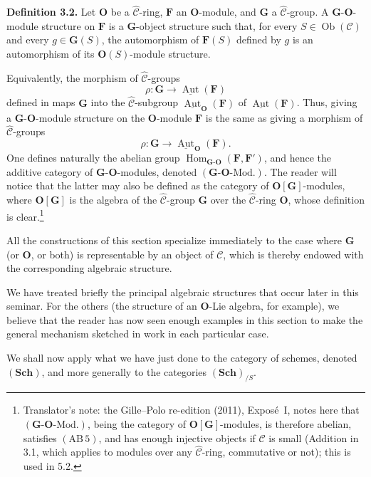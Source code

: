 \medskip
\noindent{}\textbf{Definition 3.2.}
Let \(\mathbf O\) be a \(\widehat{\mathscr C}\)-ring,
\(\mathbf F\) an \(\mathbf O\)-module, and \(\mathbf G\) a
\(\widehat{\mathscr C}\)-group. A \(\mathbf G\)-\(\mathbf O\)-module
structure on \(\mathbf F\) is a \(\mathbf G\)-object structure such that,
for every \(S\in\operatorname{Ob}(\mathscr C)\) and every
\(g\in\mathbf G(S)\), the automorphism of \(\mathbf F(S)\) defined by
\(g\) is an automorphism of its \(\mathbf O(S)\)-module structure.

Equivalently, the morphism of \(\widehat{\mathscr C}\)-groups
\[
  \rho:\mathbf G\longrightarrow
    \underline{\operatorname{Aut}}(\mathbf F)
\]
defined in  maps \(\mathbf G\) into the
\(\widehat{\mathscr C}\)-subgroup
\(\underline{\operatorname{Aut}}_{\mathbf O}(\mathbf F)\) of
\(\underline{\operatorname{Aut}}(\mathbf F)\). Thus, giving a
\(\mathbf G\)-\(\mathbf O\)-module structure on the
\(\mathbf O\)-module \(\mathbf F\) is the same as giving a morphism of
\(\widehat{\mathscr C}\)-groups
\[
  \rho:\mathbf G\longrightarrow
    \underline{\operatorname{Aut}}_{\mathbf O}(\mathbf F).
\]
One defines naturally the abelian group
\(\operatorname{Hom}_{\mathbf G\text{-}\mathbf O}
  (\mathbf F,\mathbf F')\), and hence the additive category of
\(\mathbf G\)-\(\mathbf O\)-modules, denoted
\((\mathbf G\text{-}\mathbf O\text{-Mod.})\). The reader will notice that the latter
may also be defined as the category of \(\mathbf O[\mathbf G]\)-modules,
where \(\mathbf O[\mathbf G]\) is the algebra of the
\(\widehat{\mathscr C}\)-group \(\mathbf G\) over the
\(\widehat{\mathscr C}\)-ring \(\mathbf O\), whose definition is clear.\footnote{Translator's note: the Gille--Polo re-edition (2011), Exposé~I, notes
here that \((\mathbf G\text{-}\mathbf O\text{-Mod.})\), being the category
of \(\mathbf O[\mathbf G]\)-modules, is therefore abelian, satisfies
\((\mathrm{AB}\,5)\), and has enough injective objects if \(\mathscr C\) is
small (Addition in 3.1, which applies to modules over any
\(\widehat{\mathscr C}\)-ring, commutative or not); this is used in 5.2.}

All the constructions of this section specialize immediately to the case
where \(\mathbf G\) (or \(\mathbf O\), or both) is representable by an
object of \(\mathscr C\), which is thereby endowed with the corresponding
algebraic structure.

We have treated briefly the principal algebraic structures that occur later
in this seminar. For the others (the structure of an \(\mathbf O\)-Lie
algebra, for example), we believe that the reader has now seen enough
examples in this section to make the general mechanism sketched in  work
in each particular case.

We shall now apply what we have just done to the category of schemes, denoted
\((\mathbf{Sch})\), and more generally to the categories
\((\mathbf{Sch})_{/S}\).

